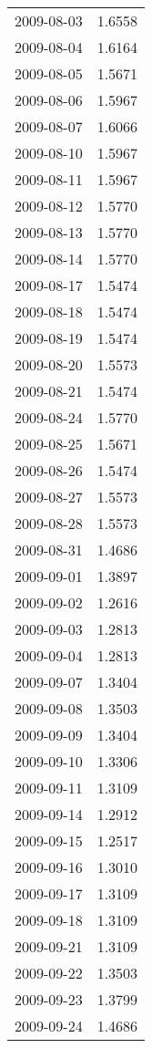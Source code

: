 \begin{tabular}{lr}
2009-08-03 &      1.6558 \\
2009-08-04 &      1.6164 \\
2009-08-05 &      1.5671 \\
2009-08-06 &      1.5967 \\
2009-08-07 &      1.6066 \\
2009-08-10 &      1.5967 \\
2009-08-11 &      1.5967 \\
2009-08-12 &      1.5770 \\
2009-08-13 &      1.5770 \\
2009-08-14 &      1.5770 \\
2009-08-17 &      1.5474 \\
2009-08-18 &      1.5474 \\
2009-08-19 &      1.5474 \\
2009-08-20 &      1.5573 \\
2009-08-21 &      1.5474 \\
2009-08-24 &      1.5770 \\
2009-08-25 &      1.5671 \\
2009-08-26 &      1.5474 \\
2009-08-27 &      1.5573 \\
2009-08-28 &      1.5573 \\
2009-08-31 &      1.4686 \\
2009-09-01 &      1.3897 \\
2009-09-02 &      1.2616 \\
2009-09-03 &      1.2813 \\
2009-09-04 &      1.2813 \\
2009-09-07 &      1.3404 \\
2009-09-08 &      1.3503 \\
2009-09-09 &      1.3404 \\
2009-09-10 &      1.3306 \\
2009-09-11 &      1.3109 \\
2009-09-14 &      1.2912 \\
2009-09-15 &      1.2517 \\
2009-09-16 &      1.3010 \\
2009-09-17 &      1.3109 \\
2009-09-18 &      1.3109 \\
2009-09-21 &      1.3109 \\
2009-09-22 &      1.3503 \\
2009-09-23 &      1.3799 \\
2009-09-24 &      1.4686 \\

\end{tabular}

